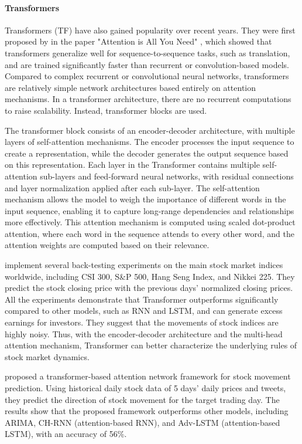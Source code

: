 \documentclass{article}
\begin{document}
\paragraph{Transformers}
Transformers (TF) have also gained popularity over recent years. They were first proposed by \cite{vaswani2017attention} in the paper "Attention is All You Need" , which showed that transformers generalize well for sequence-to-sequence tasks, such as translation, and are trained significantly faster than recurrent or convolution-based models. Compared to complex recurrent or convolutional neural networks, transformers are relatively simple network architectures based entirely on attention mechanisms. In a transformer architecture, there are no recurrent computations to raise scalability. Instead, transformer blocks are used.

The transformer block consists of an encoder-decoder architecture, with multiple layers of self-attention mechanisms. The encoder processes the input sequence to create a representation, while the decoder generates the output sequence based on this representation. Each layer in the Transformer contains multiple self-attention sub-layers and feed-forward neural networks, with residual connections and layer normalization applied after each sub-layer. The self-attention mechanism allows the model to weigh the importance of different words in the input sequence, enabling it to capture long-range dependencies and relationships more effectively. This attention mechanism is computed using scaled dot-product attention, where each word in the sequence attends to every other word, and the attention weights are computed based on their relevance.

\cite{wang2022stock} implement several back-testing experiments on the main stock market indices worldwide, including CSI 300, S\&P 500, Hang Seng Index, and Nikkei 225. They predict the stock closing price with the previous days' normalized closing prices. All the experiments demonstrate that Transformer outperforms significantly compared to other models, such as RNN and LSTM, and can generate excess earnings for investors. They suggest that the movements of stock indices are highly noisy. Thus, with the encoder-decoder architecture and the multi-head attention mechanism, Transformer can better characterize the underlying rules of stock market dynamics.

\cite{li2022incorporating} proposed a transformer-based attention network framework for stock movement prediction. Using historical daily stock data of 5 days' daily prices and tweets, they predict the direction of stock movement for the target trading day. The results show that the proposed framework outperforms other models, including ARIMA, CH-RNN (attention-based RNN), and Adv-LSTM (attention-based LSTM), with an accuracy of 56\%.
\end{document}
